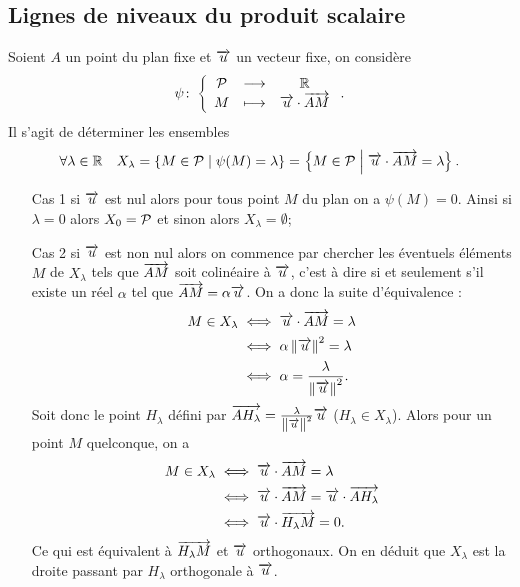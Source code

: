 \subsection{Lignes de niveaux du produit scalaire}
Soient $A$ un point du plan fixe et $\vu$ un vecteur fixe, on considère
\begin{equation}
  \fonction{\psi}{\P}{\R}{M}{\vu\cdot\vect{AM}}.
\end{equation}
Il s'agit de déterminer les ensembles
\begin{equation}
  \forall \lambda \in \R \quad  X_\lambda = \enstq{M \in \P}{\psi(M)=\lambda}=\enstq{M \in \P}{\vu \cdot \vect{AM} = \lambda}.
\end{equation}
\begin{itemize}
\item[Cas 1] si $\vu$ est nul alors pour tous point $M$ du plan on a $\psi(M)=0$. Ainsi si $\lambda=0$ alors $X_0=\P$ et sinon alors $X_\lambda=\emptyset$;
\item[Cas 2] si $\vu$ est non nul alors on commence par chercher les éventuels éléments $M$ de $X_\lambda$ tels que $\vect{AM}$ soit colinéaire à $\vu$, c'est à dire si et seulement s'il existe un réel $\alpha$ tel que $\vect{AM}=\alpha \vu$. On a donc la suite d'équivalence :
  \begin{align}
    M \in X_\lambda &\iff  \vu \cdot \vect{AM}=\lambda \\
    & \iff \alpha \norme{\vu}^2=\lambda \\
    & \iff \alpha= \frac{\lambda}{\norme{\vu}^2}.
  \end{align}
  Soit donc le point $H_\lambda$ défini par $\vect{AH_\lambda}=\frac{\lambda}{\norme{\vu}^2} \vu$ ($H_\lambda \in X_\lambda$). Alors pour un point $M$ quelconque, on a
  \begin{align}
    M \in X_\lambda &\iff  \vu \cdot \vect{AM}=\lambda \\
    &\iff  \vu \cdot \vect{AM} = \vu \cdot \vect{AH_\lambda} \\
    &\iff  \vu \cdot \vect{H_\lambda M}=0.
  \end{align}
  Ce qui est équivalent à $\vect{H_\lambda M}$ et $\vu$ orthogonaux. On en déduit que $X_\lambda$ est la droite passant par $H_\lambda$ orthogonale à $\vu$.
\end{itemize}

